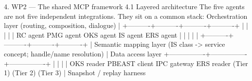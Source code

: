 4. WP2 — The shared MCP framework
4.1 Layered architecture
The five agents are not five independent integrations. They sit on a common stack:
                   Orchestration layer
                 (routing, composition, dialogue)
                              |
        +----------+----------+----------+----------+
        |          |          |          |          |
     RC agent  PMG agent  OKS agent  IS agent  ERS agent
        |          |          |          |          |
        +----------+----------+----------+----------+
                              |
                    Semantic mapping layer
        (IS class -> service concept; handle/name resolution)
                              |
                     Data access layer
         +----------------+----------------+----------------+
         |                |                |                |
    OKS reader      PBEAST client     IPC gateway      ERS reader
      (Tier 1)         (Tier 2)         (Tier 3)
                              |
                  Snapshot / replay harness

